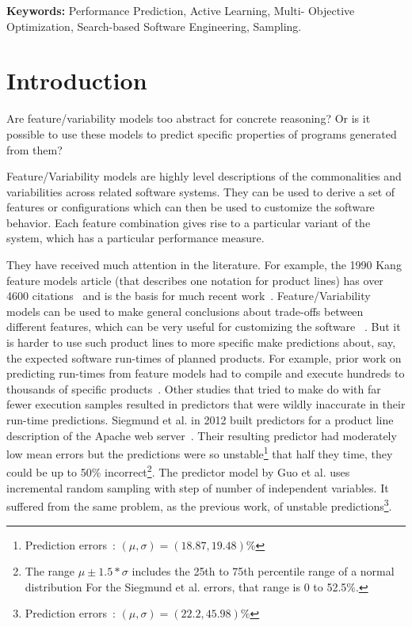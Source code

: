 \documentclass{sig-alternative}
\begin{document}
 
\noindent
{\bf Keywords:} Performance Prediction, 
Active Learning, 
Multi- Objective Optimization,
Search-based Software Engineering, Sampling.
 

 
\section{Introduction}
 
 Are feature/variability models too abstract for concrete reasoning?
Or is it possible to use these models to predict specific properties 
of programs generated from them? 

Feature/Variability models are highly level descriptions of the commonalities and variabilities   across related software systems. They can be used to derive a set of features or configurations which can then be used to customize the software behavior. Each feature combination gives rise to a particular variant of  the system, which has a particular performance measure.

They have received much attention in the literature.
For example, the 1990 Kang feature models article (that describes one notation for product lines) has over 4600 citations~\cite{kang1990feature} and is the basis for 
much recent work~\cite{lopez15,harman14,sayyad13a,sayyad13b}.
Feature/Variability models can be used to make general conclusions about trade-offs between different features, which can be very useful for customizing the software ~\cite{sayyad13a,sayyad13b}. 
But it is harder to use
such product lines to more specific make
predictions about, say, the expected software run-times of planned products. 
For example, prior work on predicting run-times from feature models had  to compile and execute
hundreds to thousands of specific products~\cite{guo2013variability}. 
Other studies that tried to make do with   far fewer execution samples resulted
in predictors that were
 wildly inaccurate in their run-time predictions.
Siegmund et al. in 2012 built predictors for a product line description of the Apache web server~\cite{siegmund2012predicting}. Their resulting predictor had moderately low mean errors   but the predictions
 were  so  unstable\footnote{Prediction errors~\cite{siegmund2012predicting}: $(\mu,\sigma)=(18.87,19.48)$\%} that half they time, they could be up to 50\% incorrect\footnote{
 The range  $\mu \pm 1.5*\sigma$  includes the
 25th to 75th percentile range of a normal distribution   
For the Siegmund et al. errors, that range is  0 to 52.5\%.}. The predictor model by Guo et al. uses incremental random sampling with step of number of independent variables. It suffered from the same problem, as the previous work, of unstable predictions\footnote{Prediction errors~\cite{siegmund2012predicting}: $(\mu,\sigma)=(22.2,45.98)$\%}.
 
\end{document}
